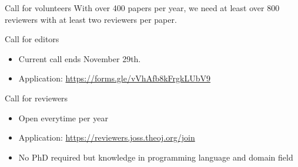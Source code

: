 \begin{frame}{Call for volunteers}
With over 400 papers per year, we need at least over 800 reviewers with at least two reviewers per paper.
\vspace{0.5cm}
\begin{block}{Call for editors}
\begin{itemize}
\item Current call ends November 29th. 
\item Application: \url{https://forms.gle/vVhAfb8kFrgkLUbV9}
\end{itemize}

\end{block}

\begin{block}{Call for reviewers}
\begin{itemize}
\item Open everytime per year
\item Application: \url{https://reviewers.joss.theoj.org/join}
\item No PhD required but knowledge in programming language and domain field
\end{itemize}

\end{block}


\end{frame}

